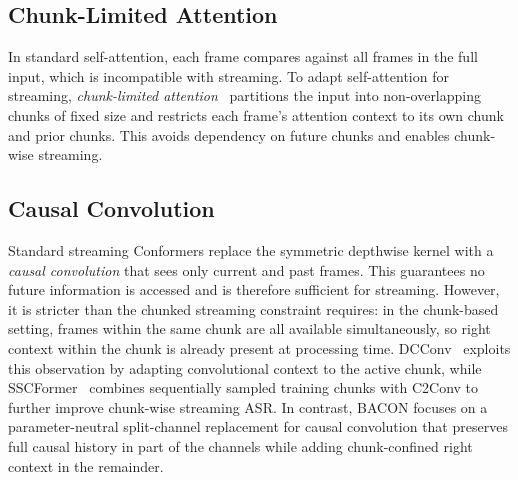 \documentclass[cameraready]{Interspeech}
\begin{document}

\subsection{Chunk-Limited Attention}
\label{subsec:chunk-attention}

In standard self-attention, each frame compares against all frames in the full
input, which is incompatible with streaming. To adapt self-attention for
streaming,
\emph{chunk-limited attention}~\cite{chen2021developing,noroozi2024stateful} partitions
the input into non-overlapping chunks of fixed size and restricts each frame's
attention context to its own chunk and prior chunks. This avoids dependency on
future chunks and enables chunk-wise streaming.

 

\subsection{Causal Convolution}
\label{subsec:causal-conv}

Standard streaming Conformers replace the symmetric depthwise kernel with a
\emph{causal convolution} that sees only current and past frames.
This
guarantees no future information is accessed and is therefore sufficient for
streaming. However, it is stricter than the chunked streaming constraint requires: in
the chunk-based setting, frames within the same chunk are all available
simultaneously, so right context within the chunk is already present at
processing time.
DCConv~\cite{li2023dynamic} exploits this observation by adapting convolutional
context to the active chunk, while SSCFormer~\cite{chunkssscformer} combines
sequentially sampled training chunks with C2Conv to further improve chunk-wise
streaming ASR. In contrast, BACON focuses on a parameter-neutral split-channel
replacement for causal convolution that preserves full causal history in part
of the channels while adding chunk-confined right context in the remainder.
\end{document}
